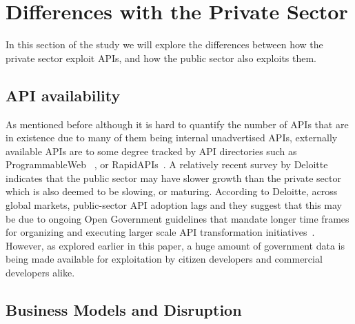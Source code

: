 \chapter{Differences with the Private Sector}

\ifpdf
    \graphicspath{{Chapter3/Figs/Raster/}{Chapter3/Figs/PDF/}{Chapter3/Figs/}}
\else
    \graphicspath{{Chapter3/Figs/Vector/}{Chapter3/Figs/}}
\fi

In this section of the study we will explore the differences between how the
private sector exploit APIs, and how the public sector also exploits them.

\section{API availability}

As mentioned before although it is hard to quantify the number of APIs that
are in existence
due to many of them being internal unadvertised APIs, externally available
APIs are to some degree tracked by API directories such as ProgrammableWeb
~\citep{programmableweb_apis}, or RapidAPIs~\citep{rapid_apis}. A relatively recent survey by Deloitte~\citep{deloitte_insights}
indicates that the public sector may have slower growth than the private
sector which is also deemed to be slowing, or maturing. According to
Deloitte, across global markets, public-sector API adoption lags and they
suggest that this may be due to ongoing Open Government guidelines that
mandate longer time frames for organizing and executing larger scale API
transformation initiatives~\citep{deloitte_insights}. However, as explored earlier in this
paper, a huge amount of government data is being made available for
exploitation by citizen developers and commercial developers alike.

\section{Business Models and Disruption}

